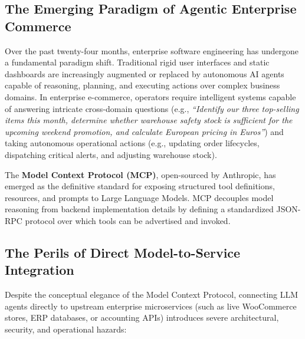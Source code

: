 \documentclass[11pt,a4paper]{article}
\begin{document}
\subsection{The Emerging Paradigm of Agentic Enterprise Commerce}
Over the past twenty-four months, enterprise software engineering has undergone a fundamental paradigm shift. Traditional rigid user interfaces and static dashboards are increasingly augmented or replaced by autonomous AI agents capable of reasoning, planning, and executing actions over complex business domains. In enterprise e-commerce, operators require intelligent systems capable of answering intricate cross-domain questions (e.g., \textit{``Identify our three top-selling items this month, determine whether warehouse safety stock is sufficient for the upcoming weekend promotion, and calculate European pricing in Euros''}) and taking autonomous operational actions (e.g., updating order lifecycles, dispatching critical alerts, and adjusting warehouse stock).

The \textbf{Model Context Protocol (MCP)}, open-sourced by Anthropic, has emerged as the definitive standard for exposing structured tool definitions, resources, and prompts to Large Language Models. MCP decouples model reasoning from backend implementation details by defining a standardized JSON-RPC protocol over which tools can be advertised and invoked.

\subsection{The Perils of Direct Model-to-Service Integration}
Despite the conceptual elegance of the Model Context Protocol, connecting LLM agents directly to upstream enterprise microservices (such as live WooCommerce stores, ERP databases, or accounting APIs) introduces severe architectural, security, and operational hazards:
\end{document}
